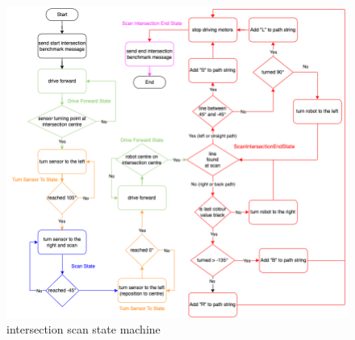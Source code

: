 \begin{figure}
    \centering
    \includegraphics[width=\textwidth]{resources/turning-intersection-state-machine.png}
    \caption{\TurningSensorRobot intersection scan state machine}
    \label{fig:turning_intersection_scan_state_machine}
\end{figure}